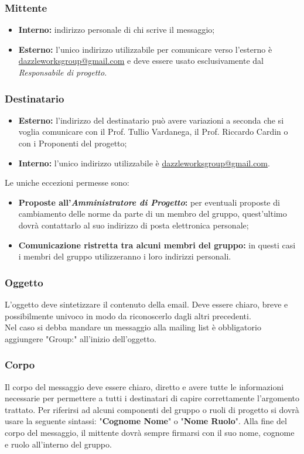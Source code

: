 		\subsubsection{Mittente}
\begin{itemize}
	\item \textbf{Interno:} indirizzo personale di chi scrive il messaggio;
	\item \textbf{Esterno:} l'unico indirizzo utilizzabile per comunicare verso l'esterno è \url{dazzleworksgroup@gmail.com} e deve essere usato esclusivamente dal \textit{Responsabile di progetto}.
\end{itemize}
	\subsubsection{Destinatario}
\begin{itemize}
	\item \textbf{Esterno:} l'indirizzo del destinatario può avere variazioni a seconda che si voglia comunicare con il Prof. Tullio Vardanega, il Prof. Riccardo Cardin o con i Proponenti del progetto;
	\item \textbf{Interno:} l'unico indirizzo utilizzabile è \url{dazzleworksgroup@gmail.com}.
\end{itemize}
Le uniche eccezioni permesse sono:
\begin{itemize}
	\item \textbf{Proposte all'\textit{Amministratore di Progetto}:} per eventuali proposte di cambiamento delle norme da parte di un membro del gruppo, quest'ultimo dovrà contattarlo al suo indirizzo di posta elettronica personale;
	\item \textbf{Comunicazione ristretta tra alcuni membri del gruppo:} in questi casi i membri del gruppo utilizzeranno i loro indirizzi personali.
\end{itemize}

		\subsubsection{Oggetto}
L'oggetto deve sintetizzare il contenuto della email. Deve essere chiaro, breve e possibilmente univoco in modo da riconoscerlo dagli altri precedenti.\\
Nel caso si debba mandare un messaggio alla mailing list è obbligatorio aggiungere "Group:" all'inizio dell'oggetto.
		\subsubsection{Corpo}
Il corpo del messaggio deve essere chiaro, diretto e avere tutte le informazioni necessarie per permettere a tutti i destinatari di capire correttamente l'argomento trattato. Per riferirsi ad alcuni componenti del gruppo o ruoli di progetto si dovrà usare la seguente sintassi: "\textbf{Cognome Nome}" o "\textbf{Nome Ruolo}". Alla fine del corpo del messaggio, il mittente dovrà sempre firmarsi con il suo nome, cognome e ruolo all'interno del gruppo.
